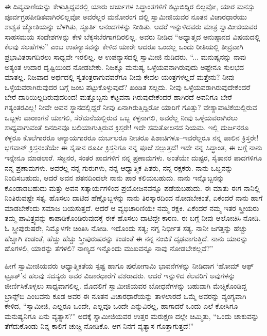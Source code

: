 ಈ ದಿವ್ಯವಾಣಿಯನ್ನು ಕೇಳುತ್ತಿದ್ದವರಲ್ಲಿ ಯಾರು ಚರ್ಚುಗಳ ಸಿದ್ಧಾಂತಗಳಿಗೆ ಕಟ್ಟುಬಿದ್ದಿರ ಲಿಲ್ಲವೋ, ಯಾರ ಮನಸ್ಸು ಪೂರ್ವಗ್ರಹಪೀಡಿತವಾಗಿರಲಿಲ್ಲವೋ ಅವರೆಲ್ಲರ ಮನೋರಂಗ ದಲ್ಲಿ ಸ್ವಾಮೀಜಿಯವರ ನೂತನ ವಿಚಾರಧಾರೆಯು ಶಾಶ್ವತ ಜ್ಯೋತಿಯನ್ನು ಬೆಳಗಿತು, ಸ್ಫೂರ್ತಿ ಆನಂದಗಳನ್ನು ನೀಡಿತು. ಆದರೆ ಇನ್ನುಳಿದವರು ಮಾತ್ರ ಸ್ವಾಮೀಜಿಯವರ ಸಾಹಸಮಯ ಸಂದೇಶಗಳನ್ನು ಕೇಳಿ ಬೆಕ್ಕಸಬೆರಗಾಗದಿರಲಿಲ್ಲ. ಅವರು ನೀಡಿದ “ಅಧ್ಯಾತ್ಮದ ಅನುಷ್ಠಾನದ ವಿಷಯದಲ್ಲಿ ಕೆಲವು ಸಲಹೆಗಳು” ಎಂಬ ಉಪನ್ಯಾಸವನ್ನು ಕೇಳಿದ ಯಾರೇ ಆದರೂ ಒಂದಲ್ಲ ಒಂದು ರೀತಿಯಲ್ಲಿ ತೀವ್ರವಾಗಿ ಪ್ರಭಾವಿತರಾಗದಿರಲು ಸಾಧ್ಯವೇ ಇರಲಿಲ್ಲ. ಆ ಉಪನ್ಯಾಸದಲ್ಲಿ ಸ್ವಾಮೀಜಿ ನುಡಿದರು, “... ಮನುಷ್ಯನನ್ನು ನಾವು ಅತ್ಯಂತ ಉದಾರ ದೃಷ್ಟಿಯಿಂದ ನೋಡಬೇಕು. ನಿಜಕ್ಕೂ ಮನುಷ್ಯ ಒಳ್ಳೆಯವನಾಗಿರುವುದು ಅಷ್ಟೇನೂ ಸುಲಭದ ಮಾತಲ್ಲ. ನಿಜವಾದ ಅರ್ಥದಲ್ಲಿ ಸ್ವತಂತ್ರರಾಗುವವರೆಗೂ ನೀವು ಕೇವಲ ಯಂತ್ರಗಳಲ್ಲದೆ ಮತ್ತೇನು? ನೀವು ಒಳ್ಳೆಯವರಾಗಿರುವುದರ ಬಗ್ಗೆ ಜಂಬ ಪಟ್ಟುಕೊಳ್ಳುವುದೆ? ಖಂಡಿತ ಸಲ್ಲದು. ನೀವು ಒಳ್ಳೆಯವರಾಗಿರುವುದೇಕೆಂದರೆ ಬೇರೆ ದಾರಿಯಿಲ್ಲದಿರುವುದರಿಂದ! ಮತ್ತೊಬ್ಬನು ಕೆಟ್ಟವನಾ ಗಿರುವುದೇಕೆಂದರೆ ಹಾಗಿರದೆ ಅವನಿಗೂ ಬೇರೆ ಗತ್ಯಂತರವಿಲ್ಲ! ನೀವೇ ಅವನ ಸ್ಥಾನದಲ್ಲಿದ್ದರೆ ನೀವು ಏನಾಗಿರುತ್ತಿದ್ದಿರೋ ಯಾರಿಗೆ ಗೊತ್ತು? ವೇಶ್ಯಾವಾಟಿಕೆಯಲ್ಲಿರುವ ಒಬ್ಬಳು ವಾರಾಂಗನೆ ಯಾಗಲಿ, ಸೆರೆಮನೆಯಲ್ಲಿರುವ ಒಬ್ಬ ಕಳ್ಳನಾಗಲಿ, ಅವರೆಲ್ಲ ನೀವು ಒಳ್ಳೆಯವರಾಗಿರಲು ಸಾಧ್ಯವಾಗುವಂತೆ ದಿನದಿನವೂ ಬಲಿಯಾಗುತ್ತಿರುವ ಕ್ರಿಸ್ತರೇ! ಇದೇ ಸಮತೋಲನದ ನಿಯಮ. ಇಲ್ಲಿ ದುರ್ಜನರೂ ಕಳ್ಳರೂ ಕೊಲೆಗಾರರೂ ಅನ್ಯಾಯಗಾರರೂ ದುರ್ಬಲರೂ ನೀಚರೂ ಪಿಶಾಚಿಗಳೂ–ಇವರೆಲ್ಲರೂ ನನ್ನ ಪಾಲಿನ ಕ್ರಿಸ್ತರೇ! ಭಗವಾನ್ ಕ್ರಿಸ್ತನಂತೆಯೇ ಈ ಸೈತಾನ ರೂಪೀ ಕ್ರಿಸ್ತನಿಗೂ ನನ್ನ ಪೂಜೆ ಸಲ್ಲುತ್ತದೆ! ಇದೇ ನನ್ನ ಸಿದ್ಧಾಂತ, ಈ ಬಗ್ಗೆ ನಾನು ಇನ್ನೇನೂ ಮಾಡಲಾರೆ. ಸಜ್ಜನರ, ಸಂತರ ಪಾದಗಳಿಗೆ ನನ್ನ ಪ್ರಣಾಮಗಳು. ಅಂತೆಯೇ ದುಷ್ಟರ, ಸೈತಾನರ ಪಾದಗಳಿಗೂ ನನ್ನ ಪ್ರಣಾಮಗಳು. ಅವರೆಲ್ಲ ನನ್ನ ಗುರುಗಳು, ನನ್ನ ಆಧ್ಯಾತ್ಮಿಕ ಪಿತರು, ನನ್ನ ರಕ್ಷಕರು. ನಾನು ಒಬ್ಬನನ್ನು ನಿಂದಿಸಬಹುದು, ಆದರೆ ಅವನ ಪತನದಿಂದಲೇ ನಾನು ಪಾಠ ಕಲಿಯಬಹುದು. ನಾನು ಇನ್ನೊಬ್ಬನನ್ನು ಕೊಂಡಾಡಬಹುದು ಮತ್ತು ಅವನ ಸತ್ಕಾರ್ಯಗಳಿಂದ ಪ್ರಯೋಜನವನ್ನೂ ಪಡೆಯಬಹುದು. ಈ ಮಾತು ಈಗ ನಾನಿಲ್ಲಿ ನಿಂತಿರುವಷ್ಟೇ ಸತ್ಯ. ಹೊಸಲು ದಾಟಿದ ಹೆಣ್ಣೊಬ್ಬಳನ್ನು ನಾನು ತಿರಸ್ಕಾರದಿಂದ ನೋಡಬೇಕಂತೆ, ಏಕೆಂದರೆ ನಾನು ಹಾಗೆ ಮಾಡಬೇಕೆಂದು ಸಮಾಜ ಬಯಸುತ್ತದೆ. ಆದರೆ ಆ ವ್ಯಭಿಚಾರಿಣಿಯೇ ನಮ್ಮ ರಕ್ಷಕಿ. ಏಕೆಂದರೆ ನಮ್ಮ ಇತರ ಸ್ತ್ರೀಯರು ತಮ್ಮ ಪಾವಿತ್ರ್ಯವನ್ನು ಕಾಪಾಡಿಕೊಂಡಿರುವುದಕ್ಕೆ ಈಕೆ ಹೊಸಲು ದಾಟಿದ್ದೇ ಕಾರಣ. ಈ ಬಗ್ಗೆ ನೀವು ಆಲೋಚಿಸಿ ನೋಡಿ. ಓ ಸ್ತ್ರೀಪುರುಷರೇ, ನಿಮ್ಮೊಳಗೇ ಚಿಂತಿಸಿ ನೋಡಿ. ಇದೊಂದು ಸತ್ಯ; ನಗ್ನ ನಿರ್ಭೀತ ಸತ್ಯ. ನಾನೀ ಜಗತ್ತನ್ನು ಹೆಚ್ಚು ಹೆಚ್ಚಾಗಿ ಕಂಡಂತೆ, ಹೆಚ್ಚು ಹೆಚ್ಚು ಸ್ತ್ರೀಪುರುಷರನ್ನು ಕಂಡಂತೆ ಈ ನನ್ನ ನಂಬಿಕೆ ದೃಢವಾಗುತ್ತಿದೆ. ನಾನು ಯಾರನ್ನು ಹೊಗಳಲಿ, ಯಾರನ್ನು ತೆಗಳಲಿ? ನಾಣ್ಯದ ಇನ್ನೊಂದು ಮುಖವನ್ನೂ ನಾವು ನೋಡಬೇಕಲ್ಲವೆ?”

ಹೀಗೆ ಸ್ವಾಮೀಜಿಯವರು ಆಧ್ಯಾತ್ಮಿಕತೆಯ ಸ್ಪಷ್ಟ ಹಾಗೂ ಪುರೋಗಾಮಿ ಭಾವನೆಗಳನ್ನು ನೀಡಿದಾಗ ‘ಹೋಮ್ ಆಫ್ ಟ್ರೂತ್​’ನ ಹಲವು ಸದಸ್ಯರು ಅವರ ವಿಚಾರಧಾರೆಗೆ ವಶರಾದರು. ಆದರೆ ಇನ್ನುಳಿದ ಕೆಲವರಿಗೆ ಅವುಗಳನ್ನು ಜೀರ್ಣಿಸಿಕೊಳ್ಳಲು ಸಾಧ್ಯವಾಗಲಿಲ್ಲ. ಮೊದಲಿಗೆ ಸ್ವಾಮೀಜಿಯವರ ಬೋಧನೆಗಳನ್ನು ಬಹುವಾಗಿ ಮೆಚ್ಚಿಕೊಂಡಿದ್ದ ಬ್ರಾನ್ಸ್​ಬಿ ಎಂಬವನು ಕೂಡ ಅವರ ಈ ನೂತನ ವಿಚಾರಧಾರೆಯನ್ನು ತಾಳಲಾರದೆ ಒಮ್ಮೆ ಅವರನ್ನು ವ್ಯಂಗ್ಯವಾಗಿ ಕೇಳಿದ, “ಸ್ವಾಮೀಜಿ, ಎಲ್ಲರೂ ಒಂದೇ, ಎಲ್ಲವೂ ಒಂದೇ ಎನ್ನುವಿರಲ್ಲ, ಹಾಗಾದರೆ ಒಂದು ಎಲೆ ಕೋಸಿಗೂ ಮನುಷ್ಯನಿಗೂ ಏನು ವ್ಯತ್ಯಾಸ?” ಅದಕ್ಕೆ ಸ್ವಾಮೀಜಿಯವರ ಉತ್ತರ ಮರುಕ್ಷಣ ದಲ್ಲೇ ಚಿಮ್ಮಿತು, “ಒಂದು ಚಾಕುವನ್ನು ತೆಗೆದುಕೊಂಡು ನಿನ್ನ ಕಾಲಿಗೆ ಚುಚ್ಚಿ ನೋಡಿಕೊ. ಆಗ ನಿನಗೆ ವ್ಯತ್ಯಾಸ ಗೊತ್ತಾಗುತ್ತದೆ!”

